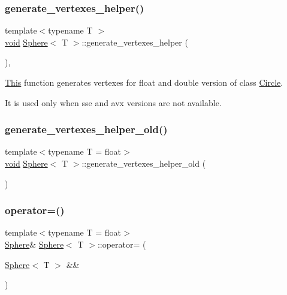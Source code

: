 \subsubsection{\texorpdfstring{generate\+\_\+vertexes\+\_\+helper()}{generate\_vertexes\_helper()}}
{\footnotesize\ttfamily template$<$typename T $>$ \\
\mbox{\hyperlink{glad_8h_a950fc91edb4504f62f1c577bf4727c29}{void}} \mbox{\hyperlink{classSphere}{Sphere}}$<$ T $>$\+::generate\+\_\+vertexes\+\_\+helper (\begin{DoxyParamCaption}{ }\end{DoxyParamCaption})\hspace{0.3cm}{\ttfamily [inline]}, {\ttfamily [private]}}



\mbox{\hyperlink{classThis}{This}} function generates vertexes for float and double version of class \mbox{\hyperlink{classCircle}{Circle}}. 

It is used only when sse and avx versions are not available. \mbox{\label{classSphere_ab739ad1931e58a4ba7c84e3ca5c1965d}} 
\subsubsection{\texorpdfstring{generate\+\_\+vertexes\+\_\+helper\+\_\+old()}{generate\_vertexes\_helper\_old()}}
{\footnotesize\ttfamily template$<$typename T = float$>$ \\
\mbox{\hyperlink{glad_8h_a950fc91edb4504f62f1c577bf4727c29}{void}} \mbox{\hyperlink{classSphere}{Sphere}}$<$ T $>$\+::generate\+\_\+vertexes\+\_\+helper\+\_\+old (\begin{DoxyParamCaption}{ }\end{DoxyParamCaption})\hspace{0.3cm}{\ttfamily [private]}}

\mbox{\label{classSphere_aa117f966cea7b16532cbd80c2191a84a}} 
\subsubsection{\texorpdfstring{operator=()}{operator=()}\hspace{0.1cm}{\footnotesize\ttfamily [1/2]}}
{\footnotesize\ttfamily template$<$typename T = float$>$ \\
\mbox{\hyperlink{classSphere}{Sphere}}\& \mbox{\hyperlink{classSphere}{Sphere}}$<$ T $>$\+::operator= (\begin{DoxyParamCaption}\item[{\mbox{\hyperlink{classSphere}{Sphere}}$<$ T $>$ \&\&}]{ }\end{DoxyParamCaption})\hspace{0.3cm}{\ttfamily [default]}}

